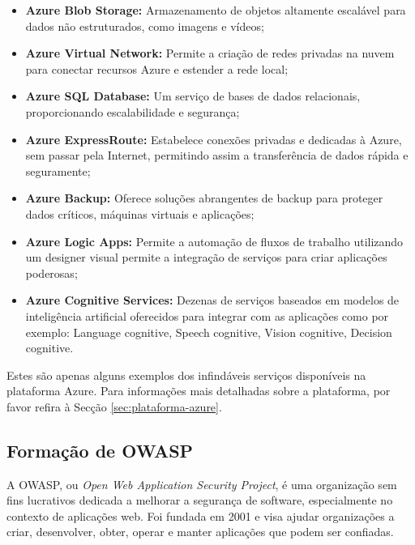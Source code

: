       \begin{itemize}
          \item \textbf{Azure Blob Storage:}
          Armazenamento de objetos altamente escalável para dados não estruturados, como imagens e vídeos;
          
          \item \textbf{Azure Virtual Network:}
          Permite a criação de redes privadas na nuvem para conectar recursos Azure e estender a rede local;
          
          \item \textbf{Azure SQL Database:}
          Um serviço de bases de dados relacionais, proporcionando escalabilidade e segurança;
          
          \item \textbf{Azure ExpressRoute:}
          Estabelece conexões privadas e dedicadas à Azure, sem passar pela Internet, permitindo assim a transferência de dados rápida e seguramente;
          
          \item \textbf{Azure Backup:}
          Oferece soluções abrangentes de backup para proteger dados críticos, máquinas virtuais e aplicações;
          
          \item \textbf{Azure Logic Apps:}
          Permite a automação de fluxos de trabalho utilizando um designer visual permite a integração de serviços para criar aplicações poderosas;

          \item \textbf{Azure Cognitive Services:}
          Dezenas de serviços baseados em modelos de inteligência artificial oferecidos para integrar com as aplicações como por exemplo: Language cognitive, Speech cognitive, Vision cognitive, Decision cognitive.
      \end{itemize}

      Estes são apenas alguns exemplos dos infindáveis serviços disponíveis na plataforma Azure. Para informações mais detalhadas sobre a plataforma, por favor refira à Secção \ref{sec:plataforma-azure}.
      
    \subsection{Formação de OWASP}\label{subsec:owasp}

      A OWASP, ou \textit{Open Web Application Security Project}, é uma organização sem fins lucrativos dedicada a melhorar a segurança de software, especialmente no contexto de aplicações web. Foi fundada em 2001 e visa ajudar organizações a criar, desenvolver, obter, operar e manter aplicações que podem ser confiadas. \cite{about-the-OWASP-foundation}

